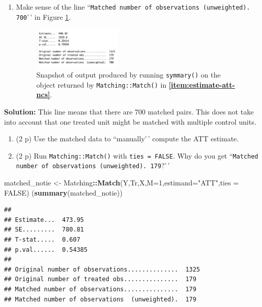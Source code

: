 \documentclass[
]{article}
\newenvironment{Shaded}{\begin{snugshade}}{\end{snugshade}}
\newcommand{\AttributeTok}[1]{\textcolor[rgb]{0.13,0.29,0.53}{#1}}
\newcommand{\ConstantTok}[1]{\textcolor[rgb]{0.56,0.35,0.01}{#1}}
\newcommand{\DecValTok}[1]{\textcolor[rgb]{0.00,0.00,0.81}{#1}}
\newcommand{\FunctionTok}[1]{\textcolor[rgb]{0.13,0.29,0.53}{\textbf{#1}}}
\newcommand{\NormalTok}[1]{#1}
\newcommand{\OtherTok}[1]{\textcolor[rgb]{0.56,0.35,0.01}{#1}}
\newcommand{\SpecialCharTok}[1]{\textcolor[rgb]{0.81,0.36,0.00}{\textbf{#1}}}
\newcommand{\StringTok}[1]{\textcolor[rgb]{0.31,0.60,0.02}{#1}}
\providecommand{\tightlist}{%
  \setlength{\itemsep}{0pt}\setlength{\parskip}{0pt}}
\begin{document}
\begin{enumerate}
\def\labelenumi{\alph{enumi}.}
\setcounter{enumi}{5}
\tightlist
\item
  Make sense of the line
  ``\texttt{Matched number of observations (unweighted). 700}'\,' in
  Figure \ref{fig:nnm_output}.

  \begin{figure}[h]
       \centering
       \captionsetup{width=.6\textwidth}
       \includegraphics[width=0.4\textwidth]{figures/q7_f.png}
       \caption{Snapshot of output produced by running \texttt{symmary()} on the object returned by \texttt{Matching::Match()} in \textbf{\ref{item:estimate-att-ncs}}.}
       \label{fig:nnm_output}
       \end{figure}
\end{enumerate}

\textbf{Solution:} This line means that there are 700 matched pairs.
This does not take into account that one treated unit might be matched
with multiple control units.

\begin{enumerate}
\def\labelenumi{\alph{enumi}.}
\setcounter{enumi}{6}
\tightlist
\item
  (2 p) Use the matched data to ``manually'\,' compute the ATT estimate.
\item
  (2 p) Run \texttt{Matching::Match()} with \texttt{ties = FALSE}. Why
  do you get
  ``\texttt{Matched number of observations (unweighted). 179}?'\,'
\end{enumerate}

\begin{Shaded}
\begin{Highlighting}[]
\NormalTok{matched\_notie }\OtherTok{\textless{}{-}}\NormalTok{ Matching}\SpecialCharTok{::}\FunctionTok{Match}\NormalTok{(Y,Tr,X,}\AttributeTok{M=}\DecValTok{1}\NormalTok{,}\AttributeTok{estimand=}\StringTok{"ATT"}\NormalTok{,}\AttributeTok{ties =} \ConstantTok{FALSE}\NormalTok{)}
\NormalTok{(}\FunctionTok{summary}\NormalTok{(matched\_notie))}
\end{Highlighting}
\end{Shaded}

\begin{verbatim}
## 
## Estimate...  473.95 
## SE.........  780.81 
## T-stat.....  0.607 
## p.val......  0.54385 
## 
## Original number of observations..............  1325 
## Original number of treated obs...............  179 
## Matched number of observations...............  179 
## Matched number of observations  (unweighted).  179
\end{verbatim}
\end{document}

